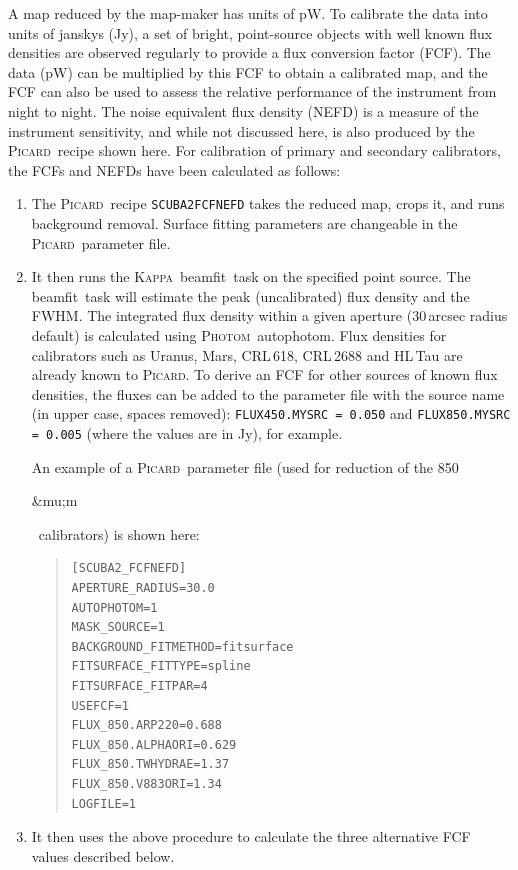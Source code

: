 \documentclass[twoside,11pt]{article}
\newcommand{\micron}{\mbox{\,${\umu}$m}}            %
\newcounter{box}
\newcommand{\xref}[3]{#1}
\renewcommand{\_}{\texttt{\symbol{95}}}
\newenvironment{myquote}{\begin{quote}\begin{small}}{\end{small}\end{quote}}
\newcommand{\Kappa}{\xref{\textsc{Kappa}}{sun95}{}}
\newcommand{\photom}{\xref{\textsc{Photom}}{sun45}{}}
\newcommand{\picard}{\xref{\textsc{Picard}}{sun265}{}}
\newcommand{\drrecipe}[1]{\texttt{#1}}
\newcommand{\task}[1]{\textsf{#1}}
\newcommand{\beamfit}{\xref{\task{beamfit}}{sun95}{BEAMFIT}}
\newcommand{\autophotom}{\xref{\task{autophotom}}{sun45}{AUTOPHOTOM}}
\renewcommand{\micron}{\begin{rawhtml}&mu;m\end{rawhtml}}
\begin{document}
A map reduced by the map-maker has units of pW. To calibrate the data
into units of janskys (Jy), a set of bright, point-source objects with
well known flux densities are observed regularly to provide a flux
conversion factor (FCF). The data (pW) can be multiplied by this FCF
to obtain a calibrated map, and the FCF can also be used to assess the
relative performance of the instrument from night to night. The noise
equivalent flux density (NEFD) is a measure of the instrument
sensitivity, and while not discussed here, is also produced by the
\picard\ recipe shown here. For calibration of primary and secondary
calibrators, the FCFs and NEFDs have been calculated as follows:
\begin{enumerate}
\item{The \picard\ recipe \drrecipe{SCUBA2\_FCFNEFD} takes the reduced
  map, crops it, and runs background removal. Surface fitting
  parameters are changeable in the \picard\ parameter file.}
\item{It then runs the \Kappa\ \beamfit\ task on the specified point
  source. The \beamfit\ task will estimate the peak (uncalibrated)
  flux density and the FWHM. The integrated flux density within a
  given aperture (30\,arcsec radius default) is calculated using
  \photom\ \autophotom. Flux densities for calibrators such as Uranus,
  Mars, CRL\,618, CRL\,2688 and HL\,Tau are already known to
  \picard. To derive an FCF for other sources of known flux densities,
  the fluxes can be added to the parameter file with the source name
  (in upper case, spaces removed): \texttt{FLUX\_450.MYSRC = 0.050}
  and \texttt{FLUX\_850.MYSRC = 0.005} (where the values are in Jy),
  for example. }

  An example of a \picard\ parameter file (used for reduction of the
  850\micron\ calibrators) is shown here:

\begin{myquote}
\begin{verbatim}
[SCUBA2_FCFNEFD]
APERTURE_RADIUS=30.0
AUTOPHOTOM=1
MASK_SOURCE=1
BACKGROUND_FITMETHOD=fitsurface
FITSURFACE_FITTYPE=spline
FITSURFACE_FITPAR=4
USEFCF=1
FLUX_850.ARP220=0.688
FLUX_850.ALPHAORI=0.629
FLUX_850.TWHYDRAE=1.37
FLUX_850.V883ORI=1.34
LOGFILE=1
\end{verbatim}
\end{myquote}

\item {It then uses the above procedure to calculate the three
  alternative FCF values described below.}
\end{enumerate}
\end{document}
